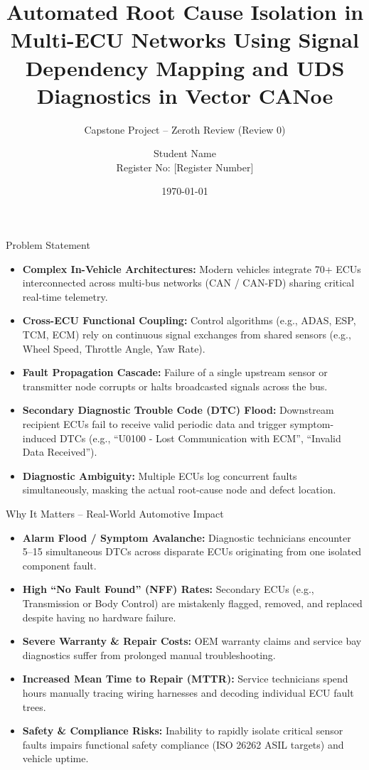 \documentclass[aspectratio=169, 10pt]{beamer}
\title[Root Cause Isolation in Multi-ECU Networks]{Automated Root Cause Isolation in Multi-ECU Networks Using Signal Dependency Mapping and UDS Diagnostics in Vector CANoe}
\subtitle{Capstone Project -- Zeroth Review (Review 0)}
\author[Student Name]{Student Name \\ \small Register No: [Register Number]}
\institute[Tata Tech Capstone]{Department of Electronics and Communication Engineering \\ In-Vehicle Networking (IVN) Capstone | Tata Technologies TechPulse}
\date{\today}
\begin{document}
\begin{frame}
  \titlepage
\end{frame}

\begin{frame}{Problem Statement}
  \begin{itemize}
    \item \textbf{Complex In-Vehicle Architectures:} Modern vehicles integrate 70+ ECUs interconnected across multi-bus networks (CAN / CAN-FD) sharing critical real-time telemetry.
    \item \textbf{Cross-ECU Functional Coupling:} Control algorithms (e.g., ADAS, ESP, TCM, ECM) rely on continuous signal exchanges from shared sensors (e.g., Wheel Speed, Throttle Angle, Yaw Rate).
    \item \textbf{Fault Propagation Cascade:} Failure of a single upstream sensor or transmitter node corrupts or halts broadcasted signals across the bus.
    \item \textbf{Secondary Diagnostic Trouble Code (DTC) Flood:} Downstream recipient ECUs fail to receive valid periodic data and trigger symptom-induced DTCs (e.g., ``U0100 - Lost Communication with ECM'', ``Invalid Data Received'').
    \item \textbf{Diagnostic Ambiguity:} Multiple ECUs log concurrent faults simultaneously, masking the actual root-cause node and defect location.
  \end{itemize}
\end{frame}

\begin{frame}{Why It Matters -- Real-World Automotive Impact}
  \begin{itemize}
    \item \textbf{Alarm Flood / Symptom Avalanche:} Diagnostic technicians encounter 5--15 simultaneous DTCs across disparate ECUs originating from one isolated component fault.
    \item \textbf{High ``No Fault Found'' (NFF) Rates:} Secondary ECUs (e.g., Transmission or Body Control) are mistakenly flagged, removed, and replaced despite having no hardware failure.
    \item \textbf{Severe Warranty \& Repair Costs:} OEM warranty claims and service bay diagnostics suffer from prolonged manual troubleshooting.
    \item \textbf{Increased Mean Time to Repair (MTTR):} Service technicians spend hours manually tracing wiring harnesses and decoding individual ECU fault trees.
    \item \textbf{Safety \& Compliance Risks:} Inability to rapidly isolate critical sensor faults impairs functional safety compliance (ISO 26262 ASIL targets) and vehicle uptime.
  \end{itemize}
\end{frame}
\end{document}

